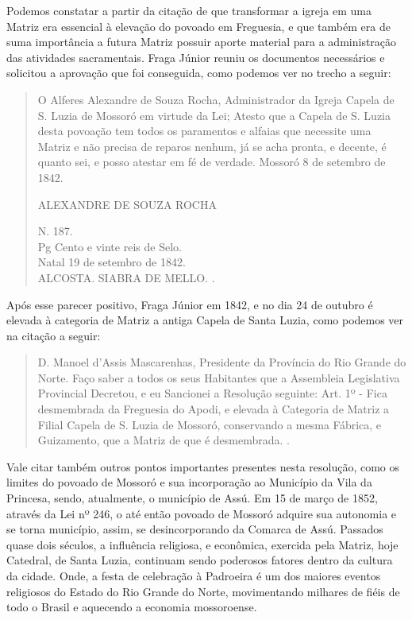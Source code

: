 \begin{refsection}
    Podemos constatar a partir da citação de que transformar a igreja em uma Matriz era essencial à elevação do povoado em Freguesia, e que também era de suma importância a futura Matriz possuir aporte material para a administração das atividades sacramentais. Fraga Júnior reuniu os documentos necessários e solicitou a aprovação que foi conseguida, como podemos ver no trecho a seguir: 

    \begin{quotation}
        O Alferes Alexandre de Souza Rocha, Administrador da Igreja Capela de S. Luzia de Mossoró em virtude da Lei; Atesto que a Capela de S. Luzia desta povoação tem todos os paramentos e alfaias que necessite uma Matriz e não precisa de reparos nenhum, já se acha pronta, e decente, é quanto sei, e posso atestar em fé de verdade. Mossoró 8 de setembro de 1842.

        \vspace{12pt}

        \noindent{}ALEXANDRE DE SOUZA ROCHA 

        \vspace{12pt}

        \noindent{}N. 187. \\
        Pg Cento e vinte reis de Selo. \\
        Natal 19 de setembro de 1842. \\
        ALCOSTA. SIABRA DE MELLO. \cite[p.~65]{Cascudo2010Notas}.
    \end{quotation}

    Após esse parecer positivo, Fraga Júnior em 1842, e no dia 24 de outubro é elevada à categoria de Matriz a antiga Capela de Santa Luzia, como podemos ver na citação a seguir:

    \begin{quotation}
        D. Manoel d'Assis Mascarenhas, Presidente da Província do Rio Grande do Norte. Faço saber a todos os seus Habitantes que a Assembleia Legislativa Provincial Decretou, e eu Sancionei a Resolução seguinte: Art. 1º - Fica desmembrada da Freguesia do Apodi, e elevada à Categoria de Matriz a Filial Capela de S. Luzia de Mossoró, conservando a mesma Fábrica, e Guizamento, que a Matriz de que é desmembrada. \cite[p.~66]{Cascudo2010Notas}.
    \end{quotation}

    Vale citar também outros pontos importantes presentes nesta resolução, como os limites do povoado de Mossoró e sua incorporação ao Município da Vila da Princesa, sendo, atualmente, o município de Assú. Em 15 de março de 1852, através da Lei nº 246, o até então povoado de Mossoró adquire sua autonomia e se torna município, assim, se desincorporando da Comarca de Assú. Passados quase dois séculos, a influência religiosa, e econômica, exercida pela Matriz, hoje Catedral, de Santa Luzia, continuam sendo poderosos fatores dentro da cultura da cidade. Onde, a festa de celebração à Padroeira é um dos maiores eventos religiosos do Estado do Rio Grande do Norte, movimentando milhares de fiéis de todo o Brasil e aquecendo a economia mossoroense.


\end{refsection}
